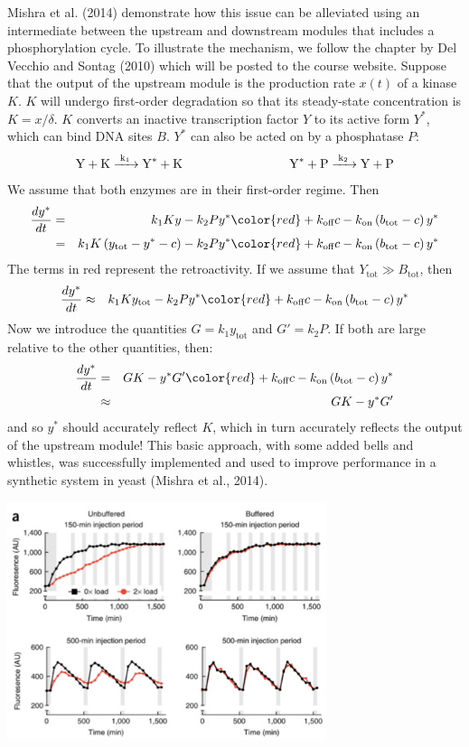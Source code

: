 \documentclass{article}
\begin{document}
Mishra et al. (2014) demonstrate how this issue can be alleviated using an intermediate between the upstream and downstream modules that includes a phosphorylation cycle. To illustrate the mechanism, we follow the chapter by Del Vecchio and Sontag (2010) which will be posted to the course website. Suppose that the output of the upstream module is the production rate $x(t)$ of a kinase $K$. $K$ will undergo first-order degradation so that its steady-state concentration is $K=x/\delta$. $K$ converts an inactive transcription factor $Y$ to its active form $Y^*$, which can bind DNA sites $B$. $Y^*$ can also be acted on by a phosphatase $P$:
\[ \ce{Y + K ->[k_1] Y^{*} + K} \hspace{3 cm} \ce{Y^* + P ->[k_2] Y + P} \]
We assume that both enzymes are in their first-order regime. Then
\begin{eqnarray*}
 \frac{dy^*}{dt} & = & k_1 K y - k_2 P y^* {\color{red} + k_{\textrm{off}} c - k_{\textrm{on}} \left( b_{\textrm{tot}} - c \right) y^* }\\
 & = & k_1 K \left(y_{\textrm{tot}} - y^* - c \right) - k_2 P y^*  { \color{red} + k_{\textrm{off}} c - k_{\textrm{on}} \left( b_{\textrm{tot}} - c \right) y^* }
 \end{eqnarray*}
The terms in red represent the retroactivity. If we assume that $Y_{\textrm{tot}} \gg B_{\textrm{tot}}$, then
\begin{eqnarray*}
 \frac{dy^*}{dt} & \approx & k_1 K y_{\textrm{tot}}  - k_2 P y^*  { \color{red} + k_{\textrm{off}} c - k_{\textrm{on}} \left( b_{\textrm{tot}} - c \right) y^* }
 \end{eqnarray*}
 Now we introduce the quantities $G=k_1 y_{\textrm{tot}}$ and $G'=k_2 P$. If both are large relative to the other quantities, then:
\begin{eqnarray*}
 \frac{dy^*}{dt} & = & G K  -  y^* G' { \color{red} + k_{\textrm{off}} c - k_{\textrm{on}} \left( b_{\textrm{tot}} - c \right) y^* }\\
 & \approx &G K  -  y^* G'
 \end{eqnarray*} 
and so $y^*$ should accurately reflect $K$, which in turn accurately reflects the output of the upstream module! This basic approach, with some added bells and whistles, was successfully implemented and used to improve performance in a synthetic system in yeast (Mishra et al., 2014).

\begin{center}
\includegraphics[width=0.7\textwidth]{retroactivity.pdf}
\end{center}
\end{document}
